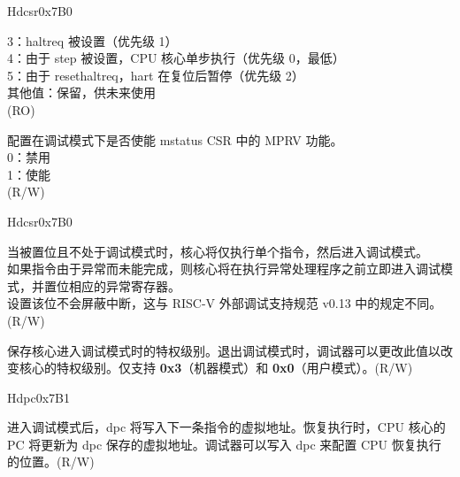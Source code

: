 \begin{register}{H}{dcsr}{0x7B0}
\begin{regdesc}
\begin{reglist}
3：haltreq 被设置（优先级 1）\\
4：由于 step 被设置，CPU 核心单步执行（优先级 0，最低）\\
5：由于 resethaltreq，hart 在复位后暂停（优先级 2）\\
其他值：保留，供未来使用\\
(RO)
\label{fielddesc:DCSRMPRVEN}\item [mprven] 配置在调试模式下是否使能 mstatus CSR 中的 MPRV 功能。\\
0：禁用 \\
1：使能\\
(R/W)
\item [见下页……]
\end{reglist}\end{regdesc}
\end{register}
\addtocounter{Regfloat}{-1}
\begin{register}{H}{dcsr}{0x7B0}
\begin{regdesc}\begin{reglist}
\item [接上页……]

\label{fielddesc:DCSRSTEP}\item [step] 当被置位且不处于调试模式时，核心将仅执行单个指令，然后进入调试模式。 \\
如果指令由于异常而未能完成，则核心将在执行异常处理程序之前立即进入调试模式，并置位相应的异常寄存器。\\
设置该位不会屏蔽中断，这与 RISC-V 外部调试支持规范 v0.13 中的规定不同。\\
(R/W)
\label{fielddesc:DCSRPRV}\item [prv] 保存核心进入调试模式时的特权级别。退出调试模式时，调试器可以更改此值以改变核心的特权级别。仅支持 \textbf{0x3}（机器模式）和 \textbf{0x0}（用户模式）。(R/W)
\end{reglist}
\end{regdesc}
\end{register}

\begin{register}{H}{dpc}{0x7B1}
\label{regdesc:DPC}
%
\regnewline%
\begin{regdesc}
\begin{reglist}
\label{fielddesc:DPC}\item [dpc] 进入调试模式后，dpc 将写入下一条指令的虚拟地址。恢复执行时，CPU 核心的 PC 将更新为 dpc 保存的虚拟地址。调试器可以写入 dpc 来配置 CPU 恢复执行的位置。(R/W)
\end{reglist}
\end{regdesc}
\end{register}

